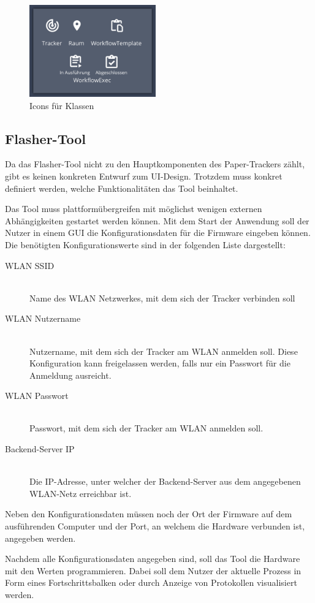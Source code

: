 \begin{figure}[h!tbp]
	\includegraphics[height=150px]{images/ui-prototype/class-icons.png}
	\centering
	\caption{Icons für Klassen}
	\label{fig:ui-icons}
\end{figure}

\subsection{Flasher-Tool}
Da das Flasher-Tool nicht zu den Hauptkomponenten des Paper-Trackers zählt, gibt es keinen konkreten Entwurf zum \gls{UI}-Design.
Trotzdem muss konkret definiert werden, welche Funktionalitäten das Tool beinhaltet.

Das Tool muss plattformübergreifen mit möglichst wenigen externen Abhängigkeiten gestartet werden können.
Mit dem Start der Anwendung soll der Nutzer in einem \gls{GUI} die Konfigurationsdaten für die Firmware eingeben können.
Die benötigten Konfigurationswerte sind in der folgenden Liste dargestellt:

\begin{description}
	\item[\gls{WLAN} \gls{SSID}] \hfill \\
		Name des \gls{WLAN} Netzwerkes, mit dem sich der Tracker verbinden soll
	\item[\gls{WLAN} Nutzername] \hfill \\
		Nutzername, mit dem sich der Tracker am \gls{WLAN} anmelden soll. Diese Konfiguration kann freigelassen werden, falls nur ein Passwort für die Anmeldung ausreicht.
	\item[\gls{WLAN} Passwort] \hfill \\
		Passwort, mit dem sich der Tracker am \gls{WLAN} anmelden soll.
	\item[Backend-Server \gls{IP}] \hfill \\
		Die IP-Adresse, unter welcher der Backend-Server aus dem angegebenen \gls{WLAN}-Netz erreichbar ist.
\end{description}

Neben den Konfigurationsdaten müssen noch der Ort der Firmware auf dem ausführenden Computer und der Port, an welchem die Hardware verbunden ist, angegeben werden.

Nachdem alle Konfigurationsdaten angegeben sind, soll das Tool die Hardware mit den Werten programmieren.
Dabei soll dem Nutzer der aktuelle Prozess in Form eines Fortschrittsbalken oder durch Anzeige von Protokollen visualisiert werden.
